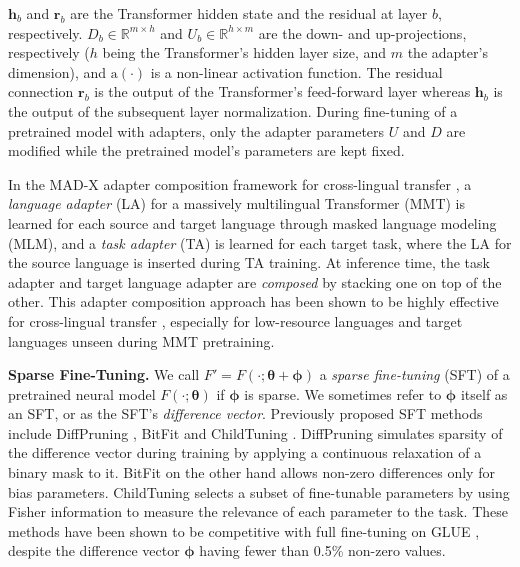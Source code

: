$\bm{h}_b$ and $\bm{r}_b$ are the Transformer hidden state and the residual at layer $b$, respectively. $D_b \in \mathbb{R}^{m \times h}$ and $U_b \in \mathbb{R}^{h \times m}$ are the down- and up-projections, respectively ($h$ being the Transformer's hidden layer size, and $m$ the adapter's dimension), and $\textrm{a}(\cdot)$ is a non-linear activation function. The residual connection $\bm{r}_b$ is the output of the Transformer's feed-forward layer whereas $\bm{h}_b$ is the output of the subsequent layer normalization. During fine-tuning of a pretrained model with adapters, only the adapter parameters $U$ and $D$ are modified while the pretrained model's parameters are kept fixed.

In the MAD-X adapter composition framework for cross-lingual transfer \citep{pfeiffer-etal-2020-mad}, a \textit{language adapter} (LA) for a massively multilingual Transformer (MMT) is learned for each source and target language through masked language modeling (MLM), and a \textit{task adapter} (TA) is learned for each target task, where the LA for the source language is inserted during TA training. At inference time, the task adapter and target language adapter are \textit{composed} by stacking one on top of the other. This adapter composition approach has been shown to be highly effective for cross-lingual transfer \citep{pfeiffer-etal-2020-mad,pfeiffer-etal-2021-unks,ansell-etal-2021-mad-g}, especially for low-resource languages and target languages unseen during MMT pretraining.

 \textbf{Sparse Fine-Tuning.} We call $F' = F(\cdot ; \bm{\theta} + \bm{\phi})$ a \textit{sparse fine-tuning} (SFT) of a pretrained neural model $F(\cdot ; \bm{\theta})$ if $\bm{\phi}$ is sparse. We sometimes refer to $\bm\phi$ itself as an SFT, or as the SFT's \textit{difference vector}. Previously proposed SFT methods include DiffPruning \citep{guo-etal-2021-parameter}, BitFit \citep{zaken-etal-2021-bitfit} and ChildTuning \citep{xu-etal-2021-raise}. DiffPruning simulates sparsity of the difference vector during training by applying a continuous relaxation of a binary mask to it. BitFit on the other hand allows non-zero differences only for bias parameters. ChildTuning selects a subset of fine-tunable parameters by using Fisher information to measure the relevance of each parameter to the task. These methods have been shown to be competitive with full fine-tuning on GLUE \citep{wang2018glue}, despite the difference vector $\bm{\phi}$ having fewer than 0.5\% non-zero values.

